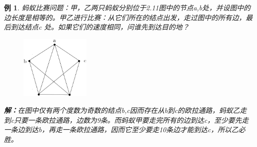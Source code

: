 \documentclass[11pt,a4paper,openany]{book}
\newtheorem{sample}{\textbf{例}}[section]
\begin{document}
\begin{sample}\K
蚂蚁比赛问题：甲，乙两只蚂蚁分别位于2.11图中的节点a,b处，并设图中的边长度是相等的。甲乙进行比赛：从它们所在的结点出发，走过图中的所有边，最后到达结点c 处。如果它们的速度相同，问谁先到达目的地？\\
\begin{figure}[h]
  \centering
  \vspace{0pt}
  \includegraphics[width=0.3\textwidth]{mayi.png}
  \caption{}
\end{figure}
\textbf{解：}在图中仅有两个度数为奇数的结点b,c因而存在从b到c的欧拉通路，蚂蚁乙走到c只要一条欧拉通路，边数为9条。而蚂蚁甲要走完所有的边到达c，至少要先走一条边到达b，再走一条欧拉通路，因而它至少要走10条边才能到达c，所以乙必胜。
\end{sample}
\end{document}
